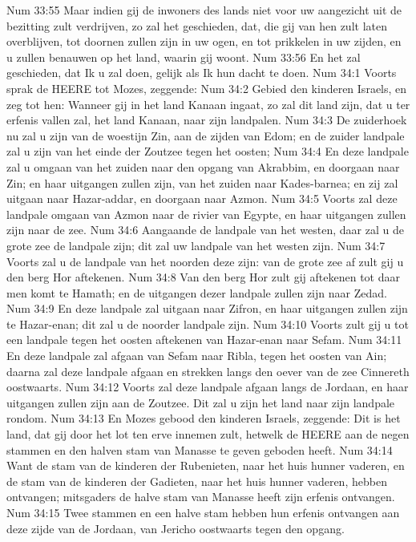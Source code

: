 Num 33:55  Maar indien gij de inwoners des lands niet voor uw aangezicht uit de bezitting zult verdrijven, zo zal het geschieden, dat, die gij van hen zult laten overblijven, tot doornen zullen zijn in uw ogen, en tot prikkelen in uw zijden, en u zullen benauwen op het land, waarin gij woont.
Num 33:56  En het zal geschieden, dat Ik u zal doen, gelijk als Ik hun dacht te doen.
Num 34:1  Voorts sprak de HEERE tot Mozes, zeggende:
Num 34:2  Gebied den kinderen Israels, en zeg tot hen: Wanneer gij in het land Kanaan ingaat, zo zal dit land zijn, dat u ter erfenis vallen zal, het land Kanaan, naar zijn landpalen.
Num 34:3  De zuiderhoek nu zal u zijn van de woestijn Zin, aan de zijden van Edom; en de zuider landpale zal u zijn van het einde der Zoutzee tegen het oosten;
Num 34:4  En deze landpale zal u omgaan van het zuiden naar den opgang van Akrabbim, en doorgaan naar Zin; en haar uitgangen zullen zijn, van het zuiden naar Kades-barnea; en zij zal uitgaan naar Hazar-addar, en doorgaan naar Azmon.
Num 34:5  Voorts zal deze landpale omgaan van Azmon naar de rivier van Egypte, en haar uitgangen zullen zijn naar de zee.
Num 34:6  Aangaande de landpale van het westen, daar zal u de grote zee de landpale zijn; dit zal uw landpale van het westen zijn.
Num 34:7  Voorts zal u de landpale van het noorden deze zijn: van de grote zee af zult gij u den berg Hor aftekenen.
Num 34:8  Van den berg Hor zult gij aftekenen tot daar men komt te Hamath; en de uitgangen dezer landpale zullen zijn naar Zedad.
Num 34:9  En deze landpale zal uitgaan naar Zifron, en haar uitgangen zullen zijn te Hazar-enan; dit zal u de noorder landpale zijn.
Num 34:10  Voorts zult gij u tot een landpale tegen het oosten aftekenen van Hazar-enan naar Sefam.
Num 34:11  En deze landpale zal afgaan van Sefam naar Ribla, tegen het oosten van Ain; daarna zal deze landpale afgaan en strekken langs den oever van de zee Cinnereth oostwaarts.
Num 34:12  Voorts zal deze landpale afgaan langs de Jordaan, en haar uitgangen zullen zijn aan de Zoutzee. Dit zal u zijn het land naar zijn landpale rondom.
Num 34:13  En Mozes gebood den kinderen Israels, zeggende: Dit is het land, dat gij door het lot ten erve innemen zult, hetwelk de HEERE aan de negen stammen en den halven stam van Manasse te geven geboden heeft.
Num 34:14  Want de stam van de kinderen der Rubenieten, naar het huis hunner vaderen, en de stam van de kinderen der Gadieten, naar het huis hunner vaderen, hebben ontvangen; mitsgaders de halve stam van Manasse heeft zijn erfenis ontvangen.
Num 34:15  Twee stammen en een halve stam hebben hun erfenis ontvangen aan deze zijde van de Jordaan, van Jericho oostwaarts tegen den opgang.
